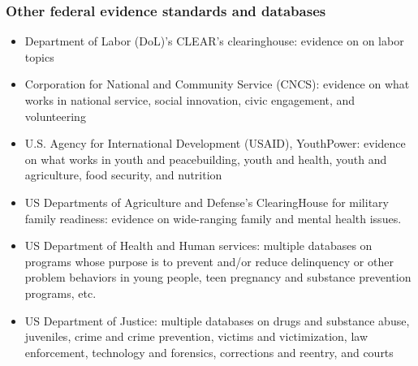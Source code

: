 \documentclass[usenames,dvipsnames]{beamer}
\begin{document}

\begin{frame}[label= other_agencies]
\frametitle{Other federal evidence standards and databases}
\scriptsize
\begin{itemize}
	\item \textcolor{Cerulean}{Department of Labor} (DoL)'s CLEAR's clearinghouse: evidence on on labor topics 
	\item \textcolor{Cerulean}{Corporation for National and Community Service} (CNCS): evidence on what works in national service, social innovation, civic engagement, and volunteering
	\item \textcolor{Cerulean}{U.S. Agency for International Development} (USAID), YouthPower:  evidence on what works in youth and peacebuilding, youth and health, youth and agriculture, food security, and nutrition
	\item \textcolor{Cerulean}{US Departments of Agriculture and Defense}'s ClearingHouse for military family readiness: evidence on wide-ranging family and mental health issues. 
	\item \textcolor{Cerulean}{US Department of Health and Human services}: multiple databases on programs whose purpose is to prevent and/or reduce delinquency or other problem behaviors in young people, teen pregnancy and substance prevention programs, etc.
	\item \textcolor{Cerulean}{US Department of Justice}: multiple databases on drugs and substance abuse, juveniles, crime and crime prevention, victims and victimization, law enforcement, technology and forensics, corrections and reentry, and courts
\end{itemize}


\end{frame}







\end{document}
